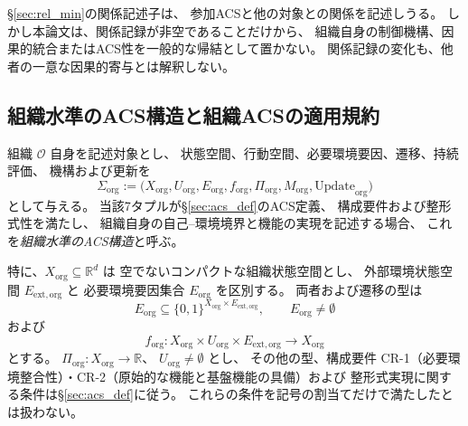\begin{remark}[関係記録と組織の機能]
\label{rem:org_relation_scope}
\S\ref{sec:rel_min}の関係記述子は、
参加ACSと他の対象との関係を記述しうる。
しかし本論文は、関係記録が非空であることだけから、
組織自身の制御機構、因果的統合またはACS性を一般的な帰結として置かない。
関係記録の変化も、他者の一意な因果的寄与とは解釈しない。
\end{remark}

\subsection{組織水準のACS構造と組織ACSの適用規約}
\label{subsec:org_formal}

\begin{definition}[組織水準のACS構造]
\label{def:org_structural_form}
組織 $\mathcal O$ 自身を記述対象とし、
状態空間、行動空間、必要環境要因、遷移、持続評価、
機構および更新を
\begin{equation}
  \Sigma_{\mathrm{org}}
  :=\bigl(
    X_{\mathrm{org}},U_{\mathrm{org}},E_{\mathrm{org}},
    f_{\mathrm{org}},\Pi_{\mathrm{org}},M_{\mathrm{org}},
    \mathrm{Update}_{\mathrm{org}}
  \bigr)
  \label{eq:org_7tuple}
\end{equation}
として与える。
当該7タプルが\S\ref{sec:acs_def}のACS定義、
構成要件および整形式性を満たし、
組織自身の自己--環境境界と機能の実現を記述する場合、
これを\emph{組織水準のACS構造}と呼ぶ。

特に、$X_{\mathrm{org}}\subseteq\mathbb R^d$ は
空でないコンパクトな組織状態空間とし、
外部環境状態空間 $E_{\mathrm{ext},\mathrm{org}}$ と
必要環境要因集合 $E_{\mathrm{org}}$ を区別する。
両者および遷移の型は
\begin{equation}
  E_{\mathrm{org}}
  \subseteq
  \{0,1\}^{X_{\mathrm{org}}\times E_{\mathrm{ext},\mathrm{org}}},
  \qquad E_{\mathrm{org}}\neq\emptyset
  \label{eq:org_environment_type}
\end{equation}
および
\begin{equation}
  f_{\mathrm{org}}:
  X_{\mathrm{org}}\times U_{\mathrm{org}}
  \times E_{\mathrm{ext},\mathrm{org}}
  \longrightarrow X_{\mathrm{org}}
  \label{eq:org_transition_type}
\end{equation}
とする。
$\Pi_{\mathrm{org}}:X_{\mathrm{org}}\to\mathbb R$、
$U_{\mathrm{org}}\neq\emptyset$ とし、
その他の型、構成要件 CR-1（必要環境整合性）・CR-2（原始的な機能と基盤機能の具備）および
整形式実現に関する条件は\S\ref{sec:acs_def}に従う。
これらの条件を記号の割当てだけで満たしたとは扱わない。
\end{definition}

